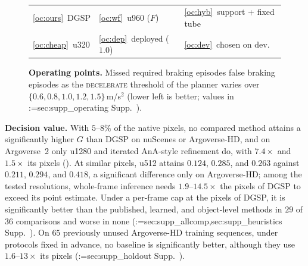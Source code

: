 \documentclass[10pt,twocolumn,letterpaper]{article}
\makeatletter
\newcommand{\method}{DGSP\xspace}
\newcommand{\full}{F}             %
\newcommand{\G}{G}                %
\theoremstyle{definition}
\theoremstyle{remark}
\DeclareRobustCommand{\supp}[1]{\def\supp@list{}\@for\supp@i:=#1\do{\ifx\supp@list\@empty\edef\supp@list{S-\supp@i}\else\edef\supp@list{\supp@list,S-\supp@i}\fi}%
\edef\supp@cmd{\noexpand\Cref*{\supp@list}}Supp.~\supp@cmd}
\makeatother
\begin{document}
\begin{figure}[t]
\\[1pt]
{\footnotesize\setlength{\tabcolsep}{4pt}\begin{tabular}{@{}lll@{}}\ref{oc:ours}~\method & \ref{oc:wf}~u960 ($\full$) & \ref{oc:hyb}~support + fixed tube \\ \ref{oc:cheap}~u320 & \ref{oc:dep}~deployed ($1.0$) & \ref{oc:dev}~chosen on dev.\end{tabular}}
\caption{\textbf{Operating points.} Missed required braking episodes \vs false braking episodes as the \textsc{decelerate} threshold of the planner varies over $\{0.6,0.8,1.0,1.2,1.5\}$\,m/s$^2$ (lower left is better; values in \supp{sec:supp_operating}).}
\label{fig:oc}
\end{figure}

\noindent\textbf{Decision value.}
With $5$--$8\%$ of the native pixels, no compared method attains a significantly higher $\G$ than \method on nuScenes or Argoverse-HD, and on Argoverse~2 only u1280 and iterated AnA-style refinement do, with $7.4\times$ and $1.5\times$ its pixels ().
At similar pixels, u512 attains $0.124$, $0.285$, and $0.263$ against $0.211$, $0.294$, and $0.418$, a significant difference only on Argoverse-HD; among the tested resolutions, whole-frame inference needs $1.9$--$14.5\times$ the pixels of \method to exceed its point estimate.
Under a per-frame cap at the pixels of \method, it is significantly better than the published, learned, and object-level methods in $29$ of $36$ comparisons and worse in none (\supp{sec:supp_allcomp,sec:supp_heuristics}).
On $65$ previously unused Argoverse-HD training sequences, under protocols fixed in advance, no baseline is significantly better, although they use $1.6$--$13\times$ its pixels (\supp{sec:supp_holdout}).
\end{document}
